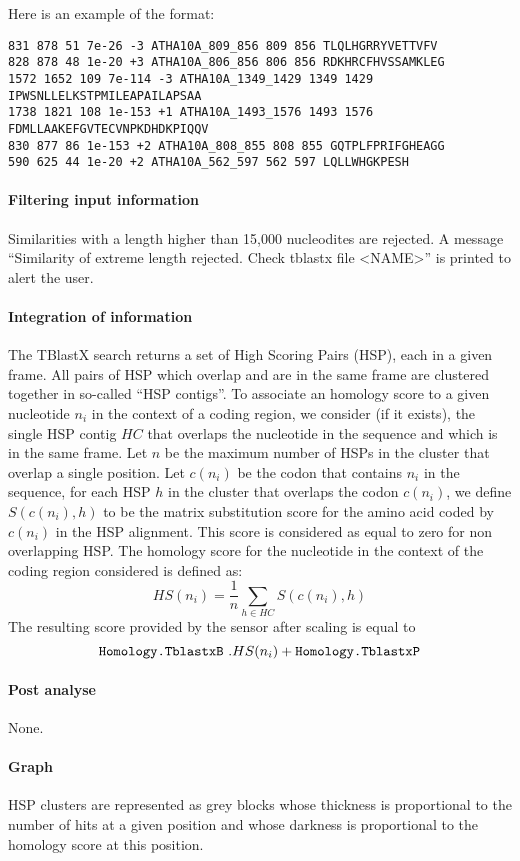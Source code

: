Here is an example of the format:
\begin{Verbatim}[fontsize=\small]
831 878 51 7e-26 -3 ATHA10A_809_856 809 856 TLQLHGRRYVETTVFV
828 878 48 1e-20 +3 ATHA10A_806_856 806 856 RDKHRCFHVSSAMKLEG
1572 1652 109 7e-114 -3 ATHA10A_1349_1429 1349 1429 IPWSNLLELKSTPMILEAPAILAPSAA
1738 1821 108 1e-153 +1 ATHA10A_1493_1576 1493 1576 FDMLLAAKEFGVTECVNPKDHDKPIQQV
830 877 86 1e-153 +2 ATHA10A_808_855 808 855 GQTPLFPRIFGHEAGG
590 625 44 1e-20 +2 ATHA10A_562_597 562 597 LQLLWHGKPESH
\end{Verbatim}

\paragraph{Filtering input information}

Similarities with a length higher than 15,000 nucleodites are
rejected. A message ``Similarity of extreme length rejected. Check
tblastx file <NAME>'' is printed to alert the user.

\paragraph{Integration of information}

The TBlastX search returns a set of High Scoring Pairs (HSP), each in
a given frame. All pairs of HSP which overlap and are in the same
frame are clustered together in so-called ``HSP contigs''. To
associate an homology score to a given nucleotide $n_i$ in the context
of a coding region, we consider (if it exists), the single HSP contig
$HC$ that overlaps the nucleotide in the sequence and which is in the
same frame. Let $n$ be the maximum number of HSPs in the cluster that
overlap a single position. Let $c(n_i)$ be the codon that contains
$n_i$ in the sequence, for each HSP $h$ in the cluster that overlaps
the codon $c(n_i)$, we define $S(c(n_i),h)$ to be the matrix
substitution score for the amino acid coded by $c(n_i)$ in the HSP
alignment. This score is considered as equal to zero for non
overlapping HSP. The homology score for the nucleotide in the context
of the coding region considered is defined as:
\[HS(n_i) = \frac{1}{n}\sum_{h\in HC} S(c(n_i),h)\]
The resulting score provided by the sensor after scaling is equal to
\[\mbox{\texttt{Homology.TblastxB}}\ . HS(n_i) + \mbox{\texttt{Homology.TblastxP}}\]

\paragraph{Post analyse}

None.

\paragraph{Graph}

HSP clusters are represented as grey blocks whose thickness is
proportional to the number of hits at a given position and whose
darkness is proportional to the homology score at this position.
